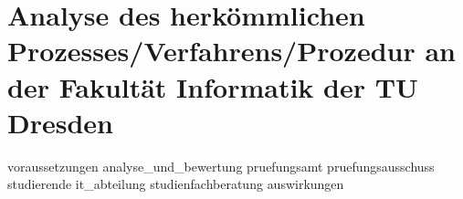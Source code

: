 \chapter{Analyse des herkömmlichen Prozesses/Verfahrens/Prozedur an der Fakultät Informatik der TU Dresden}

{voraussetzungen}
{analyse_und_bewertung}
{pruefungsamt}
{pruefungsausschuss}
{studierende}
{it_abteilung}
{studienfachberatung}
{auswirkungen}